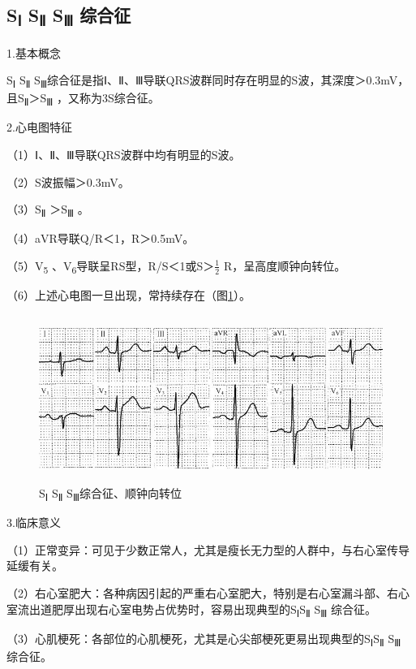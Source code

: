 \protect\hypertarget{text00009.htmlux5cux23subid51}{}{}

\subsection{S\textsubscript{Ⅰ} S\textsubscript{Ⅱ} S\textsubscript{Ⅲ} 综合征}

1.基本概念

S\textsubscript{Ⅰ} S\textsubscript{Ⅱ} S\textsubscript{Ⅲ}综合征是指Ⅰ、Ⅱ、Ⅲ导联QRS波群同时存在明显的S波，其深度＞0.3mV，且S\textsubscript{Ⅱ}＞S\textsubscript{Ⅲ} ，又称为3S综合征。

2.心电图特征

（1）Ⅰ、Ⅱ、Ⅲ导联QRS波群中均有明显的S波。

（2）S波振幅＞0.3mV。

（3）S\textsubscript{Ⅱ} ＞S\textsubscript{Ⅲ} 。

（4）aVR导联Q/R＜1，R＞0.5mV。

（5）V\textsubscript{5} 、V\textsubscript{6}导联呈RS型，R/S＜1或S＞$\frac{1}{2}$
R，呈高度顺钟向转位。

（6）上述心电图一旦出现，常持续存在（图\ref{fig3-10}）。

\begin{figure}[!htbp]
 \centering
 \includegraphics[width=5.1875in,height=2.14583in]{./images/Image00060.jpg}
 \captionsetup{justification=centering}
 \caption{S\textsubscript{Ⅰ} S\textsubscript{Ⅱ} S\textsubscript{Ⅲ}综合征、顺钟向转位}
 \label{fig3-10}
  \end{figure} 


3.临床意义

（1）正常变异：可见于少数正常人，尤其是瘦长无力型的人群中，与右心室传导延缓有关。

（2）右心室肥大：各种病因引起的严重右心室肥大，特别是右心室漏斗部、右心室流出道肥厚出现右心室电势占优势时，容易出现典型的S\textsubscript{Ⅰ}S\textsubscript{Ⅱ} S\textsubscript{Ⅲ} 综合征。

（3）心肌梗死：各部位的心肌梗死，尤其是心尖部梗死更易出现典型的S\textsubscript{Ⅰ}S\textsubscript{Ⅱ} S\textsubscript{Ⅲ} 综合征。

